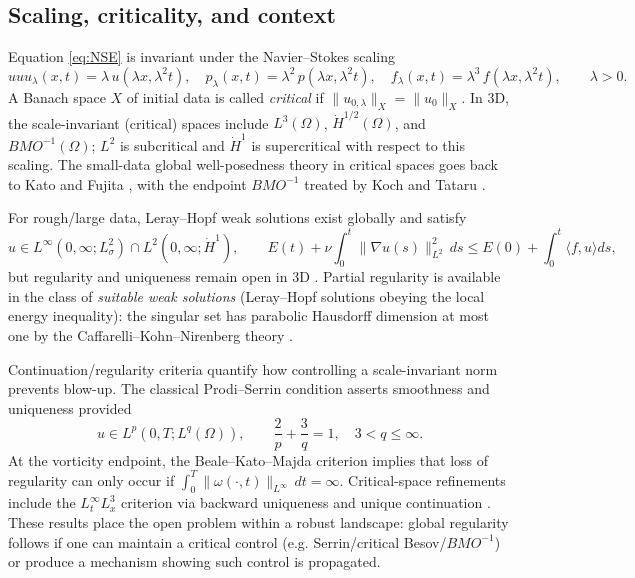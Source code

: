\IfFileExists{nyjm.cls}{\documentclass[11pt]{nyjm}}{\documentclass[11pt]{amsart}}
\theoremstyle{plain}
\theoremstyle{definition}
\theoremstyle{remark}
\begin{document}
\subsection{Scaling, criticality, and context}\label{subsec:scaling}
Equation \eqref{eq:NSE} is invariant under the Navier--Stokes scaling
\[
u
u u_\lambda(x,t)=\lambda\,u(\lambda x,\lambda^2 t),\quad
p_\lambda(x,t)=\lambda^2\,p(\lambda x,\lambda^2 t),\quad
f_\lambda(x,t)=\lambda^3\,f(\lambda x,\lambda^2 t),\qquad \lambda>0.
\]
A Banach space $X$ of initial data is called \emph{critical} if $\|u_{0,\lambda}\|_X=\|u_0\|_X$. In 3D, the scale-invariant (critical) spaces include $L^3(\Omega)$, $\dot H^{1/2}(\Omega)$, and $BMO^{-1}(\Omega)$; $L^2$ is subcritical and $\dot H^1$ is supercritical with respect to this scaling. The small-data global well-posedness theory in critical spaces goes back to Kato and Fujita \cite{FujitaKato1964,Kato1984}, with the endpoint $BMO^{-1}$ treated by Koch and Tataru \cite{KochTataru2001}.


For rough/large data, Leray--Hopf weak solutions exist globally and satisfy
\[
u\in L^\infty(0,\infty;L^2_\sigma)\cap L^2(0,\infty;\dot H^1),\qquad
E(t)+\nu\int_0^t \|\nabla u(s)\|_{L^2}^2\,ds \le E(0) + \int_0^t\!\!\langle f,u\rangle ds,
\]
but regularity and uniqueness remain open in 3D \cite{Leray1934,Hopf1951,Ladyzhenskaya1969,Lions1969}. Partial regularity is available in the class of \emph{suitable weak solutions} (Leray--Hopf solutions obeying the local energy inequality): the singular set has parabolic Hausdorff dimension at most one by the Caffarelli--Kohn--Nirenberg theory \cite{CKN1982}.


Continuation/regularity criteria quantify how controlling a scale-invariant norm prevents blow-up. The classical Prodi--Serrin condition \cite{Prodi1959,Serrin1962} asserts smoothness and uniqueness provided
\[
u\in L^p(0,T;L^q(\Omega)),\qquad \frac{2}{p}+\frac{3}{q}=1,\quad 3<q\le\infty.
\]
At the vorticity endpoint, the Beale--Kato--Majda criterion \cite{BealeKatoMajda1984} implies that loss of regularity can only occur if $\int_0^T \|\omega(\cdot,t)\|_{L^\infty}\,dt=\infty$. Critical-space refinements include the $L^\infty_t L^3_x$ criterion via backward uniqueness and unique continuation \cite{EscauriazaSereginSverak2003}. These results place the open problem within a robust landscape: global regularity follows if one can maintain a critical control (e.g. Serrin/critical Besov/$BMO^{-1}$) or produce a mechanism showing such control is propagated.
\end{document}
